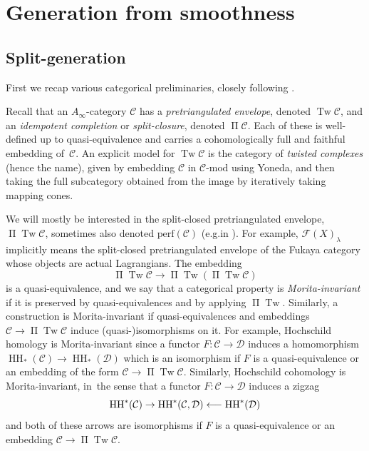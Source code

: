 \documentclass[10pt]{amsart}
\newcommand{\eg}{e.g.}
\newcommand\from{\mathchoice{\longleftarrow}{\leftarrow}{\leftarrow}{\leftarrow}}
\theoremstyle{definition}
\newcommand{\calC}{\mathcal{C}}
\newcommand{\calD}{\mathcal{D}}
\newcommand{\Fuk}{\mathcal{F}}
\newcommand{\HH}{\operatorname{HH}}
\newcommand{\Tw}{\operatorname{Tw}}
\newcommand{\oPi}{\operatorname{\Pi}}
\newcommand{\PiTw}{\oPi \Tw}
\begin{document}
\section{Generation from smoothness}
\label{secGeneration}

\subsection{Split-generation}
\label{sscGeneration}

First we recap various categorical preliminaries, closely following \cite{GanatraAutomaticGeneration}.

Recall that an $A_\infty$-category $\calC$ has a \emph{pretriangulated envelope}, denoted $\Tw \calC$, and an \emph{idempotent completion} or \emph{split-closure}, denoted $\oPi \calC$. Each of these is well-defined up to quasi-equivalence and carries a cohomologically full and faithful embedding of~$\calC$. An explicit model for $\Tw \calC$ is the category of \emph{twisted complexes} (hence the name), given by embedding $\calC$ in $\calC\text{-mod}$ using Yoneda, and then taking the full subcategory obtained from the image by iteratively taking mapping cones.

We will mostly be interested in the split-closed pretriangulated envelope, $\PiTw \calC$, sometimes also denoted $\mathrm{perf}(\calC)$ (\eg in \cite{GanatraAutomaticGeneration}). For example, $\Fuk(X)_\lambda$ implicitly means the split-closed pretriangulated envelope of the Fukaya category whose objects are actual Lagrangians. The embedding
\[
\PiTw \calC \to \PiTw(\PiTw\calC)
\]
is a quasi-equivalence, and we say that a categorical property is \emph{Morita-invariant} if it is preserved by quasi-equivalences and by applying $\PiTw$. Similarly, a construction is Morita-invariant if quasi-equivalences and embeddings $\calC \to \PiTw \calC$ induce (quasi\nobreakdash-)isomorphisms on it. For example, Hochschild homology is Morita-invariant since a functor $F : \calC \to \calD$ induces a homomorphism $\HH_*(\calC) \to \HH_*(\calD)$ which is an isomorphism if $F$ is a quasi-equivalence or an embedding of the form $\calC \to \PiTw \calC$. Similarly, Hochschild cohomology is Morita-invariant, in~the sense that a functor $F : \calC \to \calD$ induces a zigzag
\begin{equation}
\label{eqHHmaps}
\HH^*(\calC) \to \HH^*(\calC, \calD) \from \HH^*(\calD)
\end{equation}
and both of these arrows are isomorphisms if $F$ is a quasi-equivalence or an embedding $\calC \to \PiTw \calC$.
\end{document}

